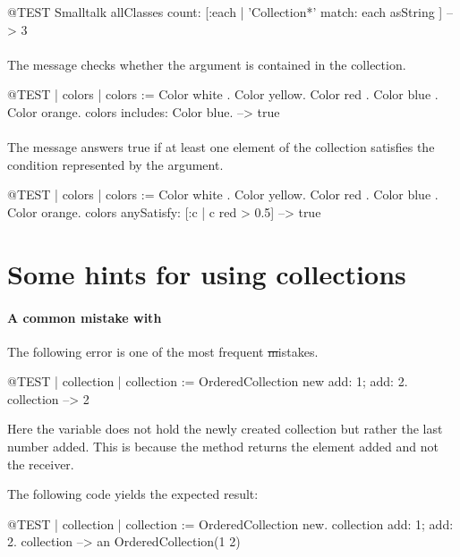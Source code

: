 \documentclass[a4paper,10pt,twoside]{book}
\begin{document}
\begin{code}{@TEST}
Smalltalk allClasses count: [:each | 'Collection*' match: each asString ] --> 3
\end{code}

\paragraph{} The message  checks whether the argument is contained in the collection. 

\begin{code}{@TEST | colors |}
colors := {Color white . Color yellow. Color red . Color blue . Color orange}.
colors includes: Color blue. --> true
\end{code}

\paragraph{} The message  answers true if at least one element of the collection satisfies the condition represented by the argument.

\begin{code}{@TEST | colors | colors := {Color white . Color yellow. Color red . Color blue . Color orange}.}
colors anySatisfy: [:c | c red > 0.5] --> true
\end{code}
\section{Some hints for using collections}

\paragraph{A common mistake with } The following error is one of the most frequent \st mistakes.

\begin{code}{@TEST | collection | }
collection := OrderedCollection new add: 1; add: 2.
collection --> 2
\end{code}
\noindent
Here the variable  does not hold the newly created collection but rather the last number added. 
This is because the method  returns the element added and not the receiver.

The following code yields the expected result:
\begin{code}{@TEST | collection |}
collection := OrderedCollection new.
collection add: 1; add: 2.
collection --> an OrderedCollection(1 2)
\end{code}
\end{document}
